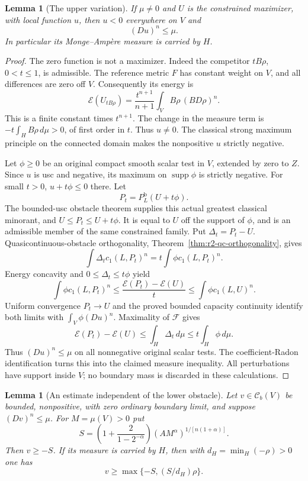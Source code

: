 \documentclass[11pt,a4paper]{article}
\numberwithin{equation}{section}
\newtheorem{lemma}[theorem]{Lemma}
\theoremstyle{definition}
\theoremstyle{remark}
\newcommand{\Cb}{\mathcal C_b}
\begin{document}
\begin{lemma}[The upper variation]
\label{lem:r3-capdir-upper-variation}
If $\mu\ne0$ and $U$ is the constrained maximizer, with local
function $u$, then $u<0$ everywhere on $V$ and
\[
 (Du)^n\leq\mu.
\]
In particular its Monge--Amp\`ere measure is carried by $H$.
\end{lemma}

\begin{proof}
The zero function is not a maximizer. Indeed the competitor
$tB\rho$, $0<t\leq1$, is admissible. The reference metric $F$
has constant weight on $V$, and all differences are zero off $V$.
Consequently its energy is
\[
 \mathcal E(U_{tB\rho})=
 \frac{t^{n+1}}{n+1}\int_V B\rho\,(BD\rho)^n.
\]
This is a finite constant times $t^{n+1}$. The change in the
measure term is $-t\int_H B\rho\,d\mu>0$, of first order in
$t$. Thus $u\ne0$. The classical strong maximum principle on
the connected domain makes the nonpositive $u$ strictly negative.

Let $\phi\geq0$ be an original compact smooth scalar test in
$V$, extended by zero to $Z$. Since $u$ is usc and negative,
its maximum on $\operatorname{supp}\phi$ is strictly negative.
For small $t>0$, $u+t\phi\leq0$ there. Let
\[
 P_t=P_L^{\mathrm b}(U+t\phi).
\]
The bounded-usc obstacle theorem supplies this actual greatest
classical minorant, and $U\leq P_t\leq U+t\phi$. It is equal
to $U$ off the support of $\phi$, and is an admissible member
of the same constrained family. Put $\Delta_t=P_t-U$.
Quasicontinuous-obstacle orthogonality,
Theorem~\ref{thm:r2-qc-orthogonality}, gives
\[
 \int\Delta_t c_1(L,P_t)^n
       =t\int\phi c_1(L,P_t)^n.
\]
Energy concavity and $0\leq\Delta_t\leq t\phi$ yield
\[
 \int\phi c_1(L,P_t)^n
 \leq\frac{\mathcal E(P_t)-\mathcal E(U)}t
 \leq\int\phi c_1(L,U)^n.
\]
Uniform convergence $P_t\to U$ and the proved bounded capacity
continuity identify both limits with $\int_V\phi(Du)^n$.
Maximality of $\mathcal F$ gives
\[
 \mathcal E(P_t)-\mathcal E(U)
       \leq\int_H\Delta_t\,d\mu
       \leq t\int_H\phi\,d\mu.
\]
Thus $(Du)^n\leq\mu$ on all nonnegative original scalar tests.
The coefficient-Radon identification turns this into the claimed
measure inequality. All perturbations have support inside $V$;
no boundary mass is discarded in these calculations.
\end{proof}

\begin{lemma}[An estimate independent of the lower obstacle]
\label{lem:r3-capdir-apriori}
Let $v\in\Cb(V)$ be bounded, nonpositive, with zero ordinary
boundary limit, and suppose $(Dv)^n\leq\mu$. For $M=\mu(V)>0$
put
\[
 S=\left(1+\frac2{1-2^{-\alpha}}\right)
                  (AM^\alpha)^{1/[n(1+\alpha)]}.
\]
Then $v\geq-S$. If its measure is carried by $H$, then with
$d_H=\min_H(-\rho)>0$ one has
\[
 v\geq\max\{-S,(S/d_H)\rho\}.
\]
\end{lemma}
\end{document}
